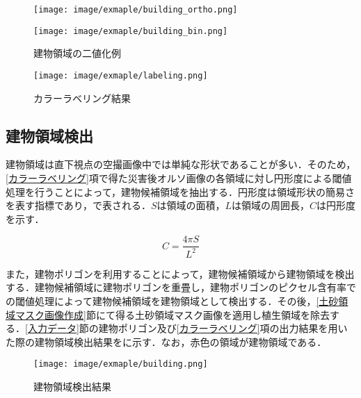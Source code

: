       \begin{figure}[tbp]
        \begin{minipage}[c]{0.5\hsize}
          \centering
          \texttt{[image: image/exmaple/building\_ortho.png]}
        \end{minipage}
        \begin{minipage}[c]{0.45\hsize}
          \centering
          \texttt{[image: image/exmaple/building\_bin.png]}
        \end{minipage}
        \caption{建物領域の二値化例}
        \label{建物領域の二値化例}
      \end{figure}

      \begin{figure}[tbp]
        \centering
        \texttt{[image: image/exmaple/labeling.png]}
        \caption{カラーラベリング結果}
        \label{カラーラベリング結果}
      \end{figure}


    \subsection{建物領域検出}
      \label{建物領域検出}
      建物領域は直下視点の空撮画像中では単純な形状であることが多い．そのため，\ref{カラーラベリング}項で得た災害後オルソ画像の各領域に対し円形度による閾値処理を行うことによって，建物候補領域を抽出する．円形度は領域形状の簡易さを表す指標であり，で表される．$S$は領域の面積，$L$は領域の周囲長，$C$は円形度を示す．

      \begin{equation}
        \label{円形度}
        C = \dfrac{4 \pi S} {L^2} 
      \end{equation}

      また，建物ポリゴンを利用することによって，建物候補領域から建物領域を検出する．建物候補領域に建物ポリゴンを重畳し，建物ポリゴンのピクセル含有率での閾値処理によって建物候補領域を建物領域として検出する．その後，\ref{土砂領域マスク画像作成}節にて得る土砂領域マスク画像を適用し植生領域を除去する．\ref{入力データ}節の建物ポリゴン及び\ref{カラーラベリング}項の出力結果を用いた際の建物領域検出結果をに示す．なお，赤色の領域が建物領域である．
      
      \begin{figure}[tbp]
        \centering
        \texttt{[image: image/exmaple/building.png]}
        \caption{建物領域検出結果}
        \label{建物領域検出結果}
      \end{figure}



